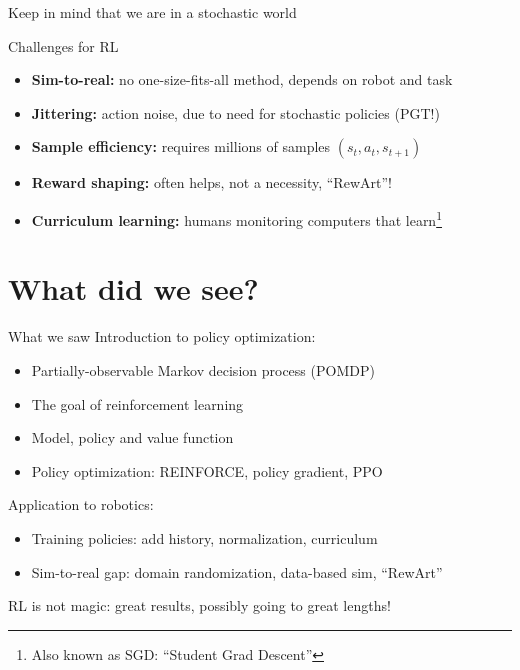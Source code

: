 \documentclass[10pt, aspectratio=1610]{beamer}
\begin{document}
\begin{frame}{Keep in mind that we are in a stochastic world}
    \begin{figure}
        \centering
        \caption{
        }
    \end{figure}
\end{frame}

\begin{frame}{Challenges for RL}
    \begin{itemize}
        \item \textbf{Sim-to-real:} no one-size-fits-all method, depends on robot and task
        \item \textbf{Jittering:} action noise, due to need for stochastic policies (PGT!)
        \item \textbf{Sample efficiency:} requires millions of samples $(s_t, a_t, s_{t+1})$
        \item \textbf{Reward shaping:} often helps, not a necessity, ``RewArt''!
        \item \textbf{Curriculum learning:} humans monitoring computers that learn\footnote{ Also known as SGD: ``Student Grad Descent''}
    \end{itemize}
\end{frame}

\section{What did we see?}

\begin{frame}{What we saw}
    Introduction to policy optimization:
    \begin{itemize}
        \item Partially-observable Markov decision process (POMDP)
        \item The goal of reinforcement learning
        \item Model, policy and value function
        \item Policy optimization: REINFORCE, policy gradient, PPO
    \end{itemize}
    Application to robotics:
    \begin{itemize}
        \item Training policies: add history, normalization, curriculum
        \item Sim-to-real gap: domain randomization, data-based sim, ``RewArt''
    \end{itemize}
    RL is not magic: great results, possibly going to great lengths!
\end{frame}
\end{document}
